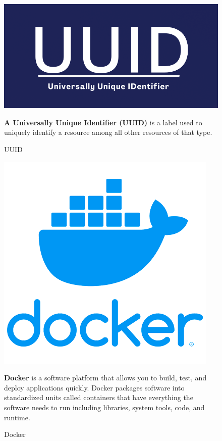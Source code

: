 \begin{figure}[h]
\centering
\begin{minipage}{0.3\textwidth}
    \centering
    \includegraphics[width=\linewidth,frame]{figures/uuid.png}
    \caption{UUID}
\end{minipage}
\hfill
\begin{minipage}{0.6\textwidth}
\textbf{A Universally Unique Identifier (UUID)} is a label used to uniquely identify a resource among all other resources of that type.\cite{samplewebs26}
\end{minipage}
\end{figure}

\begin{figure}[h]
\centering
\begin{minipage}{0.3\textwidth}
    \centering
    \includegraphics[width=\linewidth,frame]{figures/docker.png}
    \caption{Docker}
\end{minipage}
\hfill
\begin{minipage}{0.6\textwidth}
\textbf{Docker} is a software platform that allows you to build, test, and deploy applications quickly. Docker packages software into standardized units called containers that have everything the software needs to run including libraries, system tools, code, and runtime.\cite{samplewebs27}
\end{minipage}
\end{figure}

